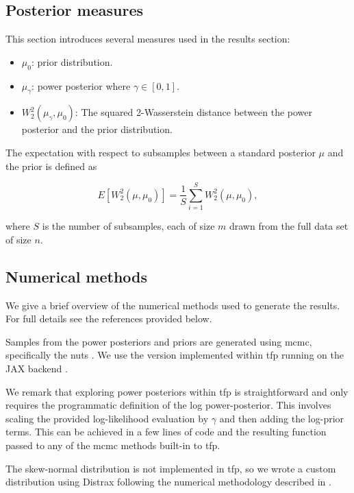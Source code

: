 \documentclass[12pt]{article}
\begin{document}
\subsection{Posterior measures}
This section introduces several measures used in the results section:
\begin{itemize}
	\item $\mu_0$: prior distribution.
	\item $\mu_{\gamma}$: power posterior where $\gamma \in [0, 1]$.
	\item $W_2^2(\mu_{\gamma}, \mu_0)$: The squared 2-Wasserstein distance between the power posterior and the prior distribution.
\end{itemize}

 The expectation with respect to subsamples between a standard posterior $\mu$ and the prior is defined as 
 
 \begin{equation}
 E [W_2^2(\mu, \mu_0)] = \frac{1}{S}\sum_{i=1}^{S} W_2^2(\mu, \mu_0),
 \label{eq:wasser_ex}
 \end{equation}
 
where $S$ is the number of subsamples, each of size  $m$ drawn from the full data set of size $n$.
 
\subsection{Numerical methods}
We give a brief overview of the numerical methods used to generate the results.
For full details see the references provided below.

Samples from the power posteriors and priors are generated using \gls{mcmc},
specifically the \gls{nuts} \citep{hoffman2014}. We use the version implemented
within \gls{tfp} \citep{dillonTensorFlowDistributions2017} running on the JAX
backend \citep{jax2018github}.

We remark that exploring power posteriors within \gls{tfp} is straightforward
and only requires the programmatic definition of the log power-posterior. This
involves scaling the provided log-likelihood evaluation by $\gamma$ and then
adding the log-prior terms. This can be achieved in a few lines of code and the
resulting function passed to any of the \gls{mcmc} methods built-in to
\gls{tfp}.

The skew-normal distribution is not implemented in \gls{tfp}, so we wrote a
custom distribution using Distrax \citep{deepmind2020jax} following the
numerical methodology described in \citep{ghorbanzadeh_method_2014}. 
\end{document}
